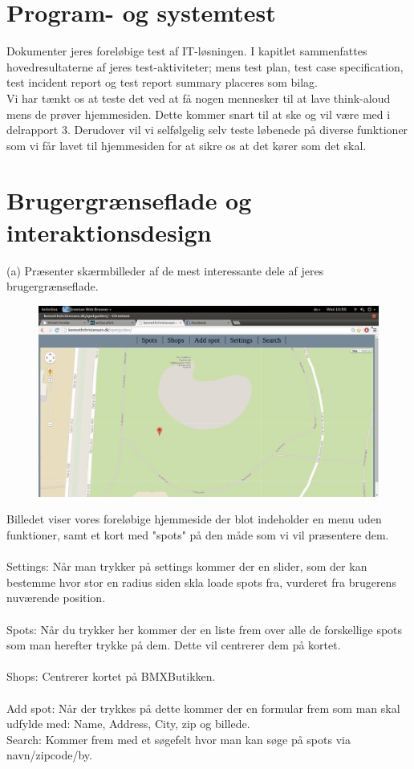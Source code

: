 \documentclass[12pt]{article}
\begin{document}
\section{Program- og systemtest}
Dokumenter jeres foreløbige test af IT-løsningen. I kapitlet sammenfattes hovedresultaterne af
jeres test-aktiviteter; mens test plan, test case specification, test incident report og test report
summary placeres som bilag.\\
Vi har tænkt os at teste det ved at få nogen mennesker til at lave think-aloud mens de prøver hjemmesiden. Dette kommer snart til at ske og vil være med i delrapport 3. Derudover vil vi selfølgelig selv teste løbenede på diverse funktioner som vi får lavet til hjemmesiden for at sikre os at det kører som det skal.
\pagebreak
\section{Brugergrænseflade og interaktionsdesign}
(a) Præsenter skærmbilleder af de mest interessante dele af jeres brugergrænseflade.

\begin{figure}[h]
\includegraphics[scale = 0.3]{screen1}
\end{figure}

Billedet viser vores foreløbige hjemmeside der blot indeholder en menu uden funktioner, samt et kort med "spots" på den måde som vi vil præsentere dem. \\ \\
Settings: 
Når man trykker på settings kommer der en slider, som der kan bestemme hvor stor en radius siden skla loade spots fra, vurderet fra brugerens nuværende position.\\\\
Spots: 
Når du trykker her kommer der en liste frem over alle de forskellige spots som man herefter trykke på dem. Dette vil centrerer dem på kortet.\\\\
Shops: 
Centrerer kortet på BMXButikken.\\\\
Add spot: 
Når der trykkes på dette kommer der en formular frem som man skal udfylde med: Name, Address, City, zip og billede.\\
Search: Kommer frem med et søgefelt hvor man kan søge på spots via navn/zipcode/by.\\
\end{document}

